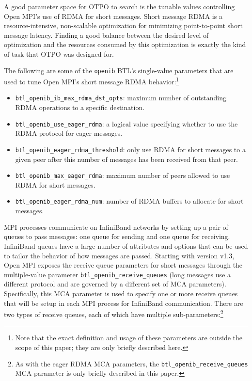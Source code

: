 A good parameter space for OTPO to search is the tunable values
controlling Open MPI's use of RDMA for short messages.  Short message
RDMA is a resource-intensive, non-scalable optimization for minimizing
point-to-point short message latency.  Finding a good balance between
the desired level of optimization and the resources consumed by this
optimization is exactly the kind of task that OTPO was designed for.

The following are some of the {\tt openib} BTL's single-value
parameters that are used to tune Open MPI's short message RDMA
behavior:\footnote{Note that the exact definition and usage of these
  parameters are outside the scope of this paper; they are only
  briefly described here.}

\begin{itemize}
\item {\tt btl\_\-openib\_\-ib\_\-max\_\-rdma\_\-dst\_\-opts}: maximum
  number of outstanding RDMA operations to a specific destination.
\item {\tt btl\_\-openib\_\-use\_\-eager\_\-rdma}: a logical value
  specifying whether to use the RDMA protocol for eager messages.
\item {\tt btl\_\-openib\_\-eager\_\-rdma\_\-threshold}: only use RDMA
  for short messages to a given peer after this number of messages has
  been received from that peer.
\item {\tt btl\_\-openib\_\-max\_\-eager\_\-rdma}: maximum number of
  peers allowed to use RDMA for short messages.
\item {\tt btl\_\-openib\_\-eager\_\-rdma\_\-num}: number of RDMA
  buffers to allocate for short messages.
\end{itemize}

MPI processes communicate on InfiniBand networks by setting up a pair
of queues to pass messages: one queue for sending and one queue for
receiving.  InfiniBand queues have a large number of attributes and
options that can be used to tailor the behavior of how messages are
passed.  Starting with version v1.3, Open MPI exposes the receive
queue parameters for short messages through the multiple-value
parameter {\tt btl\_\-openib\_\-receive\_\-queues} (long messages use
a different protocol and are governed by a different set of MCA
parameters).  Specifically, this MCA parameter is used to specify one
or more receive queues that will be setup in each MPI process for
InfiniBand communication.  There are two types of receive queues, each
of which have multiple sub-parameters:\footnote{As with the eager RDMA
  MCA parameters, the {\tt btl\_\-openib\_\-receive\_\-queues} MCA
  parameter is only briefly described in this paper.}

